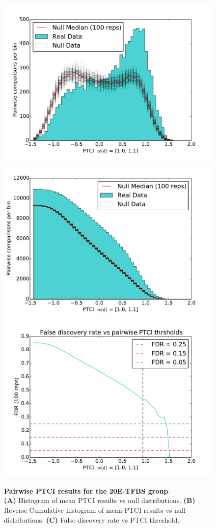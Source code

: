
\begin{figure}[hp]
%
\subcaptionbox{\label{fig:ecr-pair-ptci-hists-base}}
{\includegraphics[width=.5\linewidth]{figures/figs/ecr_team_ptci_20130918_orthodb7/pairwise_ptci_hist.pdf}}
% 
\subcaptionbox{\label{fig:ecr-pair-ptci-hists-rcum-hist}}
{\includegraphics[width=.5\linewidth]{figures/figs/ecr_team_ptci_20130918_orthodb7/pairwise_ptci_cum_hist.pdf}}
% 
\subcaptionbox{\label{fig:ecr-pair-ptci-hists-fdr}}
{\includegraphics[width=.5\linewidth]{figures/figs/ecr_team_ptci_20130918_orthodb7/pairwise_ptci_fdr.pdf}}
% 
% 
\caption[Pairwise 20E-PTCI results]{\sf \textbf{Pairwise PTCI results for the \gls{20E}-\gls{TFBS} group}:\\
\textbf{(A)} Histogram of mean PTCI results vs null distributions.
\textbf{(B)} Reverse Cumulative histogram of mean PTCI results vs null distributions.
\textbf{(C)} False discovery rate vs PTCI threshold.}
\label{fig:ecr-pair-ptci-hists}
\end{figure}